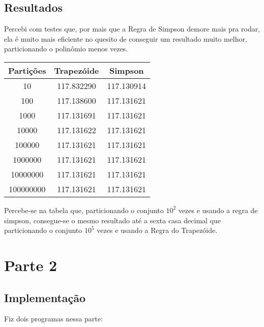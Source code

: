 \documentclass[12pt]{article}
\begin{document}
\newpage

\subsection{Resultados}

Percebi com testes que, por mais que a Regra de Simpson demore mais pra rodar, ela é muito mais eficiente no quesito de conseguir um resultado muito melhor, particionando o polinômio menos vezes.

\begin{center}
  \begin{tabular}{||c | c | c ||}
    \hline
    Partições & Trapezóide & Simpson \\ [0.5ex]
    \hline\hline
    10 & 117.832290 & 117.130914 \\
    \hline
    100 & 117.138600 & 117.131621 \\
    \hline
    1000 & 117.131691 & 117.131621 \\
    \hline
    10000 & 117.131622 & 117.131621 \\
    \hline
    100000 & 117.131621 & 117.131621 \\
    \hline
    1000000 & 117.131621 & 117.131621 \\
    \hline
    10000000 & 117.131621 & 117.131621 \\
    \hline
    100000000 & 117.131621 & 117.131621 \\
    \hline
  \end{tabular}
\end{center}

Percebe-se na tabela que, particionando o conjunto $10^2$ vezes e usando a regra de simpson, consegue-se o mesmo resultado até a sexta casa decimal que particionando o conjunto $10^5$ vezes e usando a Regra do Trapezóide.

\newpage

\section{Parte 2}

\subsection{Implementação}

Fiz dois programas nessa parte:
\end{document}
